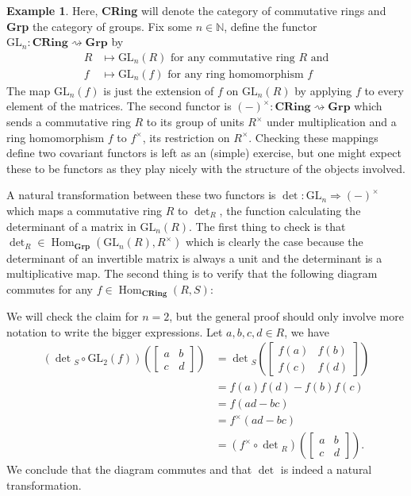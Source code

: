 \documentclass{article}
\theoremstyle{definition}
\newtheorem{exmp}[thm]{Example}
\theoremstyle{remark}
\newcommand{\N}{\mathbb{N}}
\DeclareMathOperator{\Hom}{Hom}
\newcommand{\gln}{\text{GL}_n}
\begin{document}
\begin{exmp}
	Here, \textbf{CRing} will denote the category of commutative rings and \textbf{Grp} the category of groups. Fix some $n \in \N$, define the functor $\gln:\textbf{CRing} \rightsquigarrow \textbf{Grp}$ by 
	\begin{align*}
	R &\mapsto \gln(R) \mbox{ for any commutative ring $R$ and} \\
	f &\mapsto \gln(f) \mbox{ for any ring homomorphism $f$}
	\end{align*}
	The map $\gln(f)$ is just the extension of $f$ on $\gln(R)$ by applying $f$ to every element of the matrices. The second functor is $(-)^{\times}:\textbf{CRing} \rightsquigarrow \textbf{Grp}$ which sends a commutative ring $R$ to its group of units $R^{\times}$ under multiplication and a ring homomorphism $f$ to $f^{\times}$, its restriction on $R^{\times}$. Checking these mappings define two covariant functors is left as an (simple) exercise, but one might expect these to be functors as they play nicely with the structure of the objects involved.
	
	A natural transformation between these two functors is $\det:\gln \Rightarrow (-)^{\times}$ which maps a commutative ring $R$ to $\det_R$, the function calculating the determinant of a matrix in $\gln(R)$. The first thing to check is that $\det_R \in \Hom_{\textbf{Grp}}(\gln(R), R^{\times})$ which is clearly the case because the determinant of an invertible matrix is always a unit and the determinant is a multiplicative map. The second thing is to verify that the following diagram commutes for any $f\in \Hom_{\textbf{CRing}}(R,S)$:
	\begin{figure}[H]
		\centering
	\end{figure}
	We will check the claim for $n=2$, but the general proof should only involve more notation to write the bigger expressions. Let $a,b,c,d \in R$, we have 
	\begin{align*}
	(\det{}_S \circ \text{GL}_2(f))\left( \begin{bmatrix}a&b\\c&d\end{bmatrix} \right)&= 
	\det{}_S\left(\begin{bmatrix}f(a)&f(b)\\f(c)&f(d)\end{bmatrix}\right)\\
	&= f(a)f(d)-f(b)f(c)\\
	&= f(ad-bc)\\
	&= f^{\times}(ad-bc)\\
	&= (f^{\times}\circ \det{}_R)\left( \begin{bmatrix}a&b\\c&d\end{bmatrix}\right).
	\end{align*}
	We conclude that the diagram commutes and that $\det$ is indeed a natural transformation.
\end{exmp}
\end{document}
